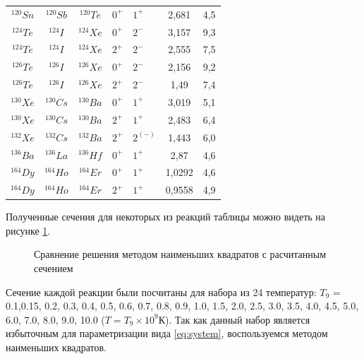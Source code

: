 \documentclass[14pt, a4paper]{article}
\numberwithin{figure}{section}
\numberwithin{equation}{section}
\begin{document}
\begin{table}
\begin{tabular}{|c|c|c|HHc|c|}
		$^{120}Sn$ & $^{120}Sb$ &$^{120}Te$& $0^+$  &  $1^+$  & 2,681 &   4,5   \\
		$^{124}Te$ & $^{124}I$  &$^{124}Xe$& $0^+$  &  $2^-$  & 3,157 &   9,3   \\
		$^{124}Te$ & $^{124}I$  &$^{124}Xe$& $2^+$  &  $2^-$  & 2,555 &   7,5   \\
		$^{126}Te$ & $^{126}I$  &$^{126}Xe$& $0^+$  &  $2^-$  & 2,156 &   9,2   \\
		$^{126}Te$ & $^{126}I$ &$^{126}Xe$ & $2^+$  &  $2^-$  & 1,49 &   7,4   \\
		$^{130}Xe$ & $^{130}Cs$ &$^{130}Ba$& $0^+$  &  $1^+$  & 3,019 &   5,1   \\
		$^{130}Xe$ & $^{130}Cs$ &$^{130}Ba$& $2^+$  &  $1^+$  & 2,483 &   6,4   \\
		$^{132}Xe$ & $^{132}Cs$ &$^{132}Ba$& $2^+$  &  $2^{(-)}$  & 1,443 &   6,0   \\
		$^{136}Ba$ & $^{136}La$ &$^{136}Hf$& $0^+$  &  $1^+$  & 2,87 &   4,6   \\
		$^{164}Dy$ & $^{164}Ho$ &$^{164}Er$& $0^+$  &  $1^+$  & 1,0292 &   4,6   \\
		$^{164}Dy$ & $^{164}Ho$ &$^{164}Er$& $2^+$  &  $1^+$  & 0,9558 &   4,9   \\
		\hline
	\end{tabular}
	\label{Tels}
\end{table}

Полученные сечения для некоторых из реакций таблицы можно видеть на рисунке \ref{ris:sigma-full}.

\begin{figure}[ht]
	\caption{Сравнение решения методом наименьших квадратов с расчитанным сечением}
	\label{ris:sigma-full}
\end{figure}

Сечение каждой реакции были посчитаны для набора из 24 температур: $T_9$ = 0.1,0.15, 0.2, 0.3, 0.4, 0.5, 0.6, 0.7, 0.8, 0.9, 1.0, 1.5, 2.0, 2.5, 3.0, 3.5, 4.0, 4.5, 5.0, 6.0, 7.0, 8.0, 9.0, 10.0 ($T = T_9 \times 10^{9}\text{К}$). Так как данный набор является избыточным для параметризации вида \ref{eq:system}, воспользуемся методом наименьших квадратов. 
\end{document}
